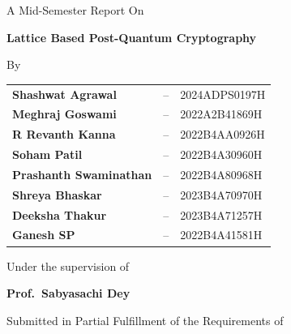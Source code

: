 \documentclass[12pt, a4paper]{article}
\theoremstyle{definition}
\theoremstyle{plain}
\begin{document}
\begin{titlepage}
    \centering
    \large A Mid-Semester Report On
    \vspace{0.5cm}

    \LARGE \textbf{Lattice Based Post-Quantum Cryptography}
    
    \vspace{0.5cm}
    


    \normalsize By

    \vspace{0.8cm}

    \begin{tabular}{@{} l l l @{}}
        \large \textbf{Shashwat Agrawal}  & \large -- & \large 2024ADPS0197H \\[4pt]
        \large \textbf{Meghraj Goswami} & \large -- & \large 2022A2B41869H \\[4pt]
        \large \textbf{R Revanth Kanna} & \large -- & \large 2022B4AA0926H \\[4pt]
        \large \textbf{Soham Patil} & \large -- & \large 2022B4A30960H \\[4pt]
        \large \textbf{Prashanth Swaminathan} & \large -- & \large 2022B4A80968H \\[4pt]
        \large \textbf{Shreya Bhaskar} & \large -- & \large 2023B4A70970H \\[4pt]
        \large \textbf{Deeksha Thakur} & \large -- & \large 2023B4A71257H \\[4pt]
        \large \textbf{Ganesh SP} & \large -- & \large 2022B4A41581H \\
    \end{tabular}
    
    \vspace{0.8cm}

    \large Under the supervision of

    \vspace{0.3cm}

    \large \textbf{Prof.\ Sabyasachi Dey}

    \vspace{0.8cm}

    \large Submitted in Partial Fulfillment of the Requirements of

    \vspace{0.3cm}


\end{titlepage}
\end{document}
